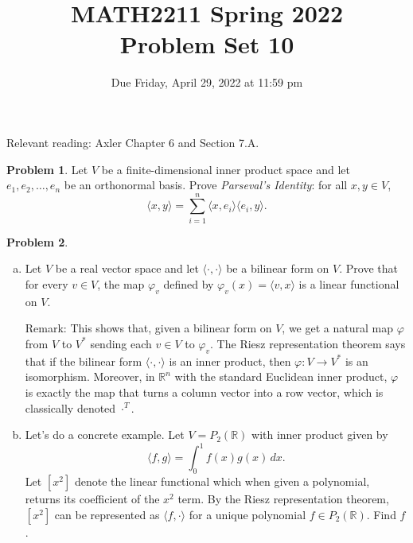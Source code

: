 \documentclass[11pt,oneside]{amsart}
\title{MATH2211 Spring 2022\\
Problem Set 10}
\author{Due Friday, April 29, 2022 at 11:59 pm}
\theoremstyle{definition}
\newtheorem{problem}{Problem}
\newcommand{\bR}{\mathbb{R}}
\begin{document}
    \maketitle

    Relevant reading: Axler Chapter 6 and Section 7.A.

    \begin{problem}
        Let $V$ be a finite-dimensional inner product space and let $e_1,e_2,\dots,e_n$ be an orthonormal basis. Prove \emph{Parseval's Identity}: for all $x,y\in V$,
        \[\langle x,y\rangle =\sum_{i=1}^n \langle x,e_i\rangle\langle e_i,y\rangle.\]
    \end{problem}

    \begin{problem}
        \leavevmode\begin{enumerate}[(a)]
            \item Let $V$ be a real vector space and let $\langle\cdot,\cdot\rangle$ be a bilinear form on $V$. Prove that for every $v\in V$, the map $\varphi_{v}$ defined by $\varphi_v(x)=\langle v,x\rangle$ is a linear functional on $V$.
            
            Remark: This shows that, given a bilinear form on $V$, we get a natural map $\varphi$ from $V$ to $V^*$ sending each $v\in V$ to $\varphi_v$. The Riesz representation theorem says that if the bilinear form $\langle\cdot,\cdot\rangle$ is an inner product, then $\varphi\colon V\to V^*$ is an isomorphism. Moreover, in $\bR^n$ with the standard Euclidean inner product, $\varphi$ is exactly the map that turns a column vector into a row vector, which is classically denoted $\cdot^T$.
            
            \item Let's do a concrete example. Let $V=P_2(\bR)$ with inner product given by
            \[\langle f,g\rangle=\int_0^1 f(x)g(x)\,dx.\]
            Let $[x^2]$ denote the linear functional which when given a polynomial, returns its coefficient of the $x^2$ term. By the Riesz representation theorem, $[x^2]$ can be represented as $\langle f,\cdot\rangle$ for a unique polynomial $f\in P_2(\bR)$. Find $f$.
        \end{enumerate}
    \end{problem}
    
\end{document}
